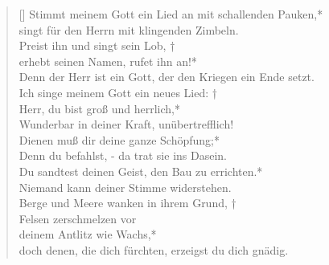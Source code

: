 \begin{verse}[\versewidth]
 Stimmt meinem Gott ein Lied an mit schallenden Pauken,*\\
singt für den Herrn mit klingenden Zimbeln.\\
\vin Preist ihn und singt sein Lob, †\\
\vin erhebt seinen Namen, rufet ihn an!*\\
\vin Denn der Herr ist ein Gott, der den Kriegen ein Ende setzt.\\
Ich singe meinem Gott ein neues Lied: †\\
Herr, du bist groß und herrlich,*\\
Wunderbar in deiner Kraft, unübertrefflich!\\
\vin Dienen muß dir deine ganze Schöpfung;*\\
\vin Denn du befahlst,  - da trat sie ins Dasein.\\
Du sandtest deinen Geist, den Bau zu errichten.*\\
Niemand kann deiner Stimme widerstehen.\\
\vin Berge und Meere wanken in ihrem Grund, †\\
\vin Felsen zerschmelzen vor\\ 
\vin deinem Antlitz wie Wachs,*\\
\vin doch denen, die dich fürchten, erzeigst du dich gnädig.\\
\end{verse}


\vspace{0.6cm}



